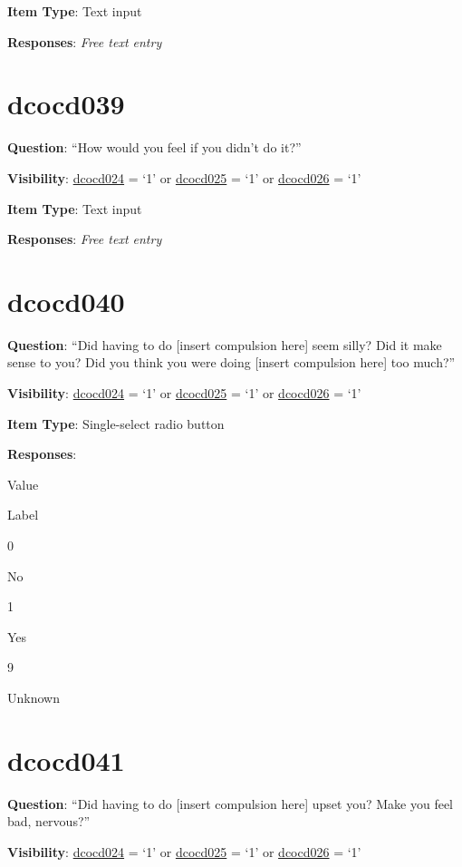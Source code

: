 \documentclass[]{book}
\begin{document}
\textbf{Item Type}: Text input

\textbf{Responses}: \emph{Free text entry}

\hypertarget{dcocd039}{%
\section{dcocd039}\label{dcocd039}}

\textbf{Question}: ``How would you feel if you didn't do it?''

\textbf{Visibility}: \protect\hyperlink{dcocd024}{dcocd024} = `1' or \protect\hyperlink{dcocd025}{dcocd025} = `1' or \protect\hyperlink{dcocd026}{dcocd026} = `1'

\textbf{Item Type}: Text input

\textbf{Responses}: \emph{Free text entry}

\hypertarget{dcocd040}{%
\section{dcocd040}\label{dcocd040}}

\textbf{Question}: ``Did having to do {[}insert compulsion here{]} seem silly? Did it make sense to you? Did you think you were doing {[}insert compulsion here{]} too much?''

\textbf{Visibility}: \protect\hyperlink{dcocd024}{dcocd024} = `1' or \protect\hyperlink{dcocd025}{dcocd025} = `1' or \protect\hyperlink{dcocd026}{dcocd026} = `1'

\textbf{Item Type}: Single-select radio button

\textbf{Responses}:

Value

Label

0

No

1

Yes

9

Unknown

\hypertarget{dcocd041}{%
\section{dcocd041}\label{dcocd041}}

\textbf{Question}: ``Did having to do {[}insert compulsion here{]} upset you? Make you feel bad, nervous?''

\textbf{Visibility}: \protect\hyperlink{dcocd024}{dcocd024} = `1' or \protect\hyperlink{dcocd025}{dcocd025} = `1' or \protect\hyperlink{dcocd026}{dcocd026} = `1'
\end{document}
